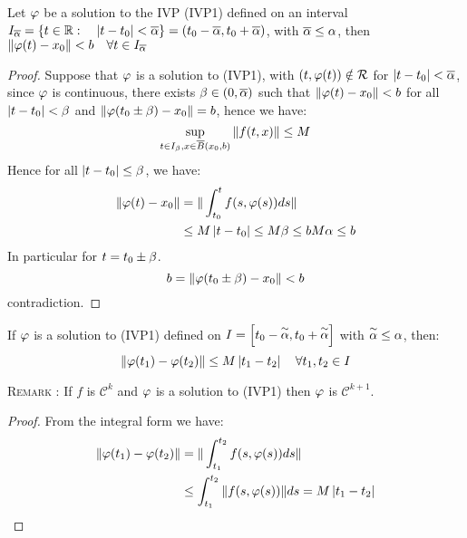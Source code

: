 
\begin{proposition}[]
Let $\varphi  $ be a solution to the IVP (IVP1) defined
on an interval $I_{\overline{\alpha}} = 
\left\{ t \in   \mathbb{R} : \quad \left| t-t_0 \right|  < \overline{\alpha} \right\} = 
(t_0-\overline{\alpha}, t_0 + \overline{\alpha}) $, with 
$\overline{\alpha}\leq \alpha$, then $\| \varphi (t) - x_0 \| < b \quad 
\forall  t \in   I_{\overline{\alpha}}$ 
\end{proposition}
\begin{proof}
Suppose that $\varphi  $ is a solution to (IVP1), with 
$(t, \varphi  (t) ) \notin  \mathcal{R} $ for 
$\left| t-t_0 \right|  < \overline{\alpha} $, since 
$\varphi  $ is continuous, there exists $\beta \in   (0, \overline{\alpha})  $ such that $\| \varphi (t) - x_0 \| < b $ for all
$\left| t-t_0 \right|  < \beta  $ and 
$\| \varphi (t_0 \pm \beta ) - x_0  \|  = b$, hence we have: 
\[
\sup_{t \in  I_{\beta }, x \in   \overline{B}(x_0, b) } 
\| f(t, x)  \| \leq M
\]
Hence for all $\left| t-t_0 \right|  \leq \beta $, we have:
\begin{align*}
  \| \varphi (t) - x_0  \|  &=
  \| \int_{t_0}^{t} f(s, \varphi (s) ) ds \|  \\
  & \leq 
  M \left| t-t_0 \right|   \leq M \beta  \leq  b
  M\alpha \leq   b
\end{align*}
In particular for $t = t_0 \pm \beta  $.
\[
b = \| \varphi (t_0 \pm \beta )  - x_0 \| < b
\]
contradiction.
\end{proof}
\begin{proposition}[]
If $\varphi  $ is a solution to (IVP1) defined on $I = \left[ t_0 - \overset{\sim}{\alpha} , t_0  + \overset{\sim}{\alpha}  \right] $ 
with $\overset{\sim}{\alpha}  \leq  \alpha $, then: 
\[
\| \varphi (t_1)  - \varphi (t_2)  \|  \leq  M \left| t_1-t_2 \right| 
\quad \forall t_1, t_2 \in  I
\]
\end{proposition}
\noindent \textcolor{purple!90!blue}{
 \textsc{Remark :}
} If $f $ is $\mathcal{C} ^{k} $ and $\varphi  $ 
is a solution to (IVP1) then $\varphi  $ is 
$\mathcal{C} ^{k+1} $.
\begin{proof}
From the integral form we have: 
\begin{align*}
  \| \varphi (t_1)  - \varphi (t_2)  \|  &= 
  \| \int_{t_1}^{t_2} f(s, \varphi (s) ) ds  \|  
  \\
                                 &\leq  
  \int_{t_1}^{t_2}  
  \| f(s, \varphi (s) )  \|  ds = M \left| t_1 - t_2 \right|
\end{align*}
\end{proof}
